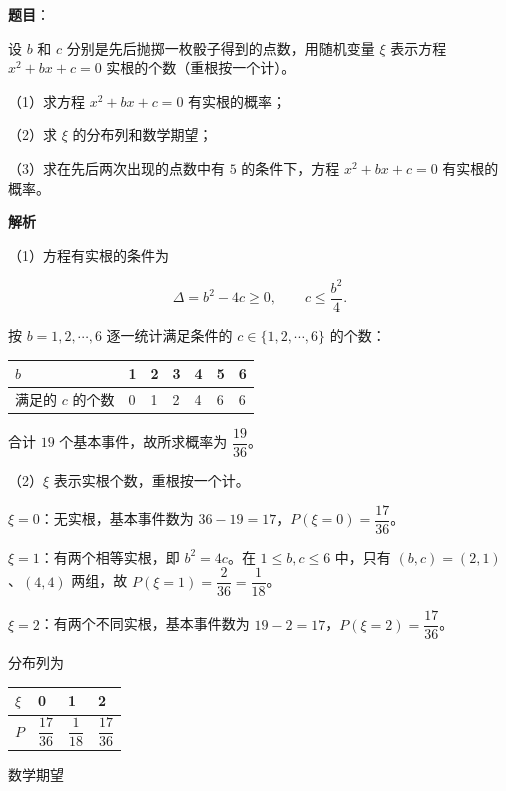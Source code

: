 \begin{answer}

\textbf{题目}：

设 $b$ 和 $c$ 分别是先后抛掷一枚骰子得到的点数，用随机变量 $\xi$ 表示方程 $x^2+bx+c=0$ 实根的个数（重根按一个计）。

（1）求方程 $x^2+bx+c=0$ 有实根的概率；

（2）求 $\xi$ 的分布列和数学期望；

（3）求在先后两次出现的点数中有 $5$ 的条件下，方程 $x^2+bx+c=0$ 有实根的概率。

\textbf{解析}

（1）方程有实根的条件为

\nopagebreak[4]
\[\Delta=b^2-4c\geqslant0,\qquad c\leqslant\frac{b^2}{4}.\]

按 $b=1,2,\cdots,6$ 逐一统计满足条件的 $c\in\{1,2,\cdots,6\}$ 的个数：

\begin{center}
\begin{tabular}{lllllll}
\toprule
$b$ & 1 & 2 & 3 & 4 & 5 & 6 \\
\midrule
满足的 $c$ 的个数 & 0 & 1 & 2 & 4 & 6 & 6 \\
\bottomrule
\end{tabular}
\end{center}

合计 $19$ 个基本事件，故所求概率为 $\dfrac{19}{36}$。

（2）$\xi$ 表示实根个数，重根按一个计。

$\xi=0$：无实根，基本事件数为 $36-19=17$，$P(\xi=0)=\dfrac{17}{36}$。

$\xi=1$：有两个相等实根，即 $b^2=4c$。在 $1\leqslant b,c\leqslant6$ 中，只有 $(b,c)=(2,1)$、$(4,4)$ 两组，故 $P(\xi=1)=\dfrac{2}{36}=\dfrac{1}{18}$。

$\xi=2$：有两个不同实根，基本事件数为 $19-2=17$，$P(\xi=2)=\dfrac{17}{36}$。

分布列为

\begin{center}
\begin{tabular}{llll}
\toprule
$\xi$ & 0 & 1 & 2 \\
\midrule
$P$ & $\dfrac{17}{36}$ & $\dfrac{1}{18}$ & $\dfrac{17}{36}$ \\
\bottomrule
\end{tabular}
\end{center}

数学期望


\end{answer}

